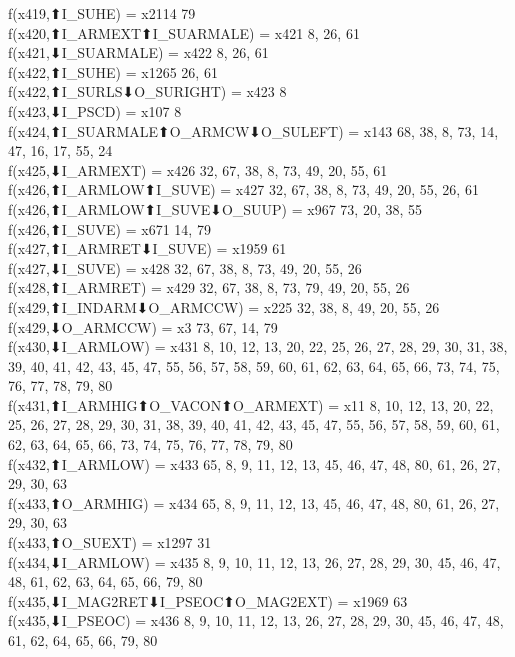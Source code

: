 f(x419,⬆I_SUHE) = x2114 {79} \\
f(x420,⬆I_ARMEXT⬆I_SUARMALE) = x421 {8, 26, 61} \\
f(x421,⬇I_SUARMALE) = x422 {8, 26, 61} \\
f(x422,⬆I_SUHE) = x1265 {26, 61} \\
f(x422,⬆I_SURLS⬇O_SURIGHT) = x423 {8} \\
f(x423,⬇I_PSCD) = x107 {8} \\
f(x424,⬆I_SUARMALE⬆O_ARMCW⬇O_SULEFT) = x143 {68, 38, 8, 73, 14, 47, 16, 17, 55, 24} \\
f(x425,⬇I_ARMEXT) = x426 {32, 67, 38, 8, 73, 49, 20, 55, 61} \\
f(x426,⬆I_ARMLOW⬆I_SUVE) = x427 {32, 67, 38, 8, 73, 49, 20, 55, 26, 61} \\
f(x426,⬆I_ARMLOW⬆I_SUVE⬇O_SUUP) = x967 {73, 20, 38, 55} \\
f(x426,⬆I_SUVE) = x671 {14, 79} \\
f(x427,⬆I_ARMRET⬇I_SUVE) = x1959 {61} \\
f(x427,⬇I_SUVE) = x428 {32, 67, 38, 8, 73, 49, 20, 55, 26} \\
f(x428,⬆I_ARMRET) = x429 {32, 67, 38, 8, 73, 79, 49, 20, 55, 26} \\
f(x429,⬆I_INDARM⬇O_ARMCCW) = x225 {32, 38, 8, 49, 20, 55, 26} \\
f(x429,⬇O_ARMCCW) = x3 {73, 67, 14, 79} \\
f(x430,⬇I_ARMLOW) = x431 {8, 10, 12, 13, 20, 22, 25, 26, 27, 28, 29, 30, 31, 38, 39, 40, 41, 42, 43, 45, 47, 55, 56, 57, 58, 59, 60, 61, 62, 63, 64, 65, 66, 73, 74, 75, 76, 77, 78, 79, 80} \\
f(x431,⬆I_ARMHIG⬆O_VACON⬆O_ARMEXT) = x11 {8, 10, 12, 13, 20, 22, 25, 26, 27, 28, 29, 30, 31, 38, 39, 40, 41, 42, 43, 45, 47, 55, 56, 57, 58, 59, 60, 61, 62, 63, 64, 65, 66, 73, 74, 75, 76, 77, 78, 79, 80} \\
f(x432,⬆I_ARMLOW) = x433 {65, 8, 9, 11, 12, 13, 45, 46, 47, 48, 80, 61, 26, 27, 29, 30, 63} \\
f(x433,⬆O_ARMHIG) = x434 {65, 8, 9, 11, 12, 13, 45, 46, 47, 48, 80, 61, 26, 27, 29, 30, 63} \\
f(x433,⬆O_SUEXT) = x1297 {31} \\
f(x434,⬇I_ARMLOW) = x435 {8, 9, 10, 11, 12, 13, 26, 27, 28, 29, 30, 45, 46, 47, 48, 61, 62, 63, 64, 65, 66, 79, 80} \\
f(x435,⬇I_MAG2RET⬇I_PSEOC⬆O_MAG2EXT) = x1969 {63} \\
f(x435,⬇I_PSEOC) = x436 {8, 9, 10, 11, 12, 13, 26, 27, 28, 29, 30, 45, 46, 47, 48, 61, 62, 64, 65, 66, 79, 80} \\

